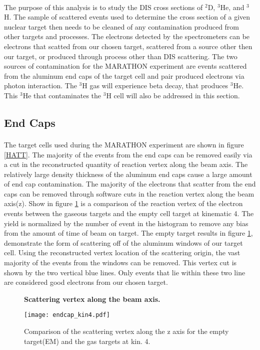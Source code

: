 \paragraph{} The purpose of this analysis is to study the DIS cross sections of $^2$D, $^3$He, and $^3$H. The sample of scattered events used to determine the cross section of a given nuclear target then needs to be cleaned of any contamination produced from other targets and processes. The electrons detected by the spectrometers can be electrons that scatted from our chosen target, scattered from a source other then our target, or produced through process other than DIS scattering. The two sources of contamination for the MARATHON experiment are events scattered from the aluminum end caps of the target cell and pair produced electrons via photon interaction. The $^3$H gas will experience beta decay, that produces $^3$He. This $^3$He that contaminates the $^3$H cell will also be addressed in this section.
\subsection{End Caps}
\paragraph{} The target cells used during the MARATHON experiment are shown in figure \ref{HATT}. The majority of the events from the end caps can be removed easily via a cut in the reconstructed quantity of reaction vertex along the beam axis. The relatively large density thickness of the aluminum end caps cause a large amount of end cap contamination. The majority of the electrons that scatter from the end caps can be removed through software cuts in the reaction vertex along the beam axis(z). Show in figure \ref{EC5} is a comparison of the reaction vertex of the electron events between the gaseous targets and the empty cell target at kinematic 4. The yield is normalized by the number of event in the histogram to remove any bias from the amount of time of beam on target. The empty target  results in figure \ref{EC5}, demonstrate the form of scattering off of the aluminum windows of our target cell. Using the reconstructed vertex location of the scattering origin, the vast majority of the events from the windows can be removed. This vertex cut is shown by the two vertical blue lines. Only events that lie within these two line are considered good electrons from our chosen target. 


\begin{figure}[]
	\centering
	\textbf{Scattering vertex along the beam axis. }\par\medskip
	\texttt{[image: endcap\_kin4.pdf]}
	\caption{Comparison of the scattering vertex along the z axis for the empty target(EM) and the gas targets at kin. 4. }
	\label{EC5}
\end{figure}

